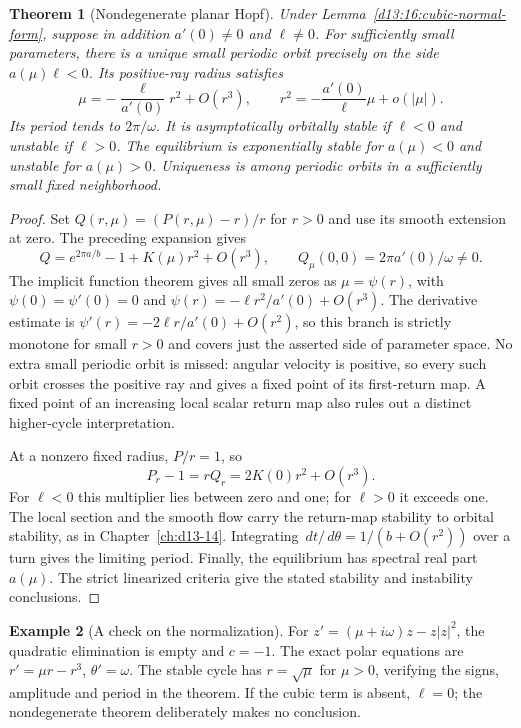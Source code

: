 \documentclass[11pt,oneside]{book}
\newtheorem{theorem}{Theorem}[chapter]
\theoremstyle{definition}
\newtheorem{example}[theorem]{Example}
\theoremstyle{remark}\newtheorem{remark}[theorem]{Remark}
\newcommand{\dd}{\,d}\newcommand{\id}{\operatorname{id}}
\newcommand{\abs}[1]{\lvert#1\rvert}\newcommand{\norm}[1]{\lVert#1\rVert}
\begin{document}
\begin{theorem}[Nondegenerate planar Hopf]\label{d13:16:planar-hopf}
Under Lemma~\ref{d13:16:cubic-normal-form}, suppose in addition
\(a'(0)\neq0\) and \(\ell\neq0\).
For sufficiently small parameters, there is a unique small periodic
orbit precisely on the side \(a(\mu)\ell<0\). Its positive-ray radius
satisfies
\[
 \mu=-\frac{\ell}{a'(0)}r^2+O(r^3),\qquad
 r^2=-\frac{a'(0)}{\ell}\mu+o(\abs{\mu}).
\]
Its period tends to \(2\pi/\omega\).
It is asymptotically orbitally stable if \(\ell<0\) and unstable if
\(\ell>0\). The equilibrium is exponentially stable for \(a(\mu)<0\)
and unstable for \(a(\mu)>0\). Uniqueness is among periodic orbits
in a sufficiently small fixed neighborhood.
\end{theorem}
\begin{proof}
Set \(Q(r,\mu)=(P(r,\mu)-r)/r\) for \(r>0\) and use its smooth extension
at zero. The preceding expansion gives
\[
 Q=e^{2\pi a/b}-1+K(\mu)r^2+O(r^3),\qquad
 Q_\mu(0,0)=2\pi a'(0)/\omega\neq0.
\]
The implicit function theorem gives all small zeros as
\(\mu=\psi(r)\), with \(\psi(0)=\psi'(0)=0\) and
\(\psi(r)=-\ell r^2/a'(0)+O(r^3)\).
The derivative estimate is
\(\psi'(r)=-2\ell r/a'(0)+O(r^2)\), so this branch is strictly monotone
for small \(r>0\) and covers just the asserted side of parameter space.
No extra small periodic orbit is missed: angular velocity is positive,
so every such orbit crosses the positive ray and gives a fixed point of
its first-return map. A fixed point of an increasing local scalar return
map also rules out a distinct higher-cycle interpretation.

At a nonzero fixed radius, \(P/r=1\), so
\[
 P_r-1=rQ_r=2K(0)r^2+O(r^3).
\]
For \(\ell<0\) this multiplier lies between zero and one; for
\(\ell>0\) it exceeds one. The local section and the smooth flow carry
the return-map stability to orbital stability, as in
Chapter~\ref{ch:d13-14}. Integrating
\(\dd t/\dd\theta=1/(b+O(r^2))\) over a turn gives the limiting period.
Finally, the equilibrium has spectral real part \(a(\mu)\). The strict
linearized criteria give the stated stability and instability conclusions.
\end{proof}

\begin{example}[A check on the normalization]
For \(z'=(\mu+i\omega)z-z\abs{z}^2\), the quadratic elimination is
empty and \(c=-1\). The exact polar equations are
\(r'=\mu r-r^3\), \(\theta'=\omega\). The stable cycle has
\(r=\sqrt{\mu}\) for \(\mu>0\), verifying the signs, amplitude and
period in the theorem. If the cubic term is absent, \(\ell=0\);
the nondegenerate theorem deliberately makes no conclusion.
\end{example}
\end{document}
